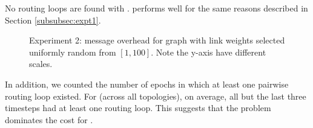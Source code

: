 No routing loops are found with \purges. \cpr performs well for the same reasons described in Section \ref{subsubsec:expt1}.  

\begin{figure*}[t]
\centering
{}
\caption{Experiment 2: message overhead for \er graph with link weights selected uniformly random from $[1,100]$. Note the y-axis have different scales.}
\label{fig:msg-rand}
\end{figure*}



In addition, we counted the number of epochs in which at least one pairwise routing loop existed.  For \second (across all topologies), on average, all but the last three 
timesteps had at least one routing loop.  This suggests that the \infinity problem dominates the cost for \seconds. 

